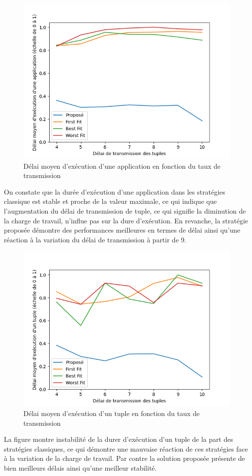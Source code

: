 \begin{figure}[H]
    \centering
    \includegraphics[]{src/ressources/loopDelayPerTransmitRate.png}
    \caption{Délai moyen d'exécution d’une application en fonction du taux de transmission}
    \label{fig:}
\end{figure}
On constate que la durée d'exécution d'une application dans les stratégies classique est stable et proche de la valeur maximale, ce qui indique que l'augmentation du délai de transmission de tuple, ce qui signifie la diminution de la charge de travail, n'influe pas sur la dure d'exécution. En revanche, la stratégie proposée démontre des performances meilleures en termes de délai ainsi qu'une réaction à la variation du délai de transmission à partir de 9. 


\begin{figure}[H]
    \centering
    \includegraphics[]{src/ressources/tupleDelayPerTransmitRate.png}
    \caption{Délai moyen d'exécution d’un tuple en fonction du taux de transmission}
    \label{fig:}
\end{figure}
La figure montre instabilité de la durer d'exécution d'un tuple de la part des stratégies classiques, ce qui démontre une mauvaise réaction de ces stratégies face à la variation de la charge de travail. Par contre la solution proposée présente de bien meilleurs délais ainsi qu'une meilleur stabilité. 